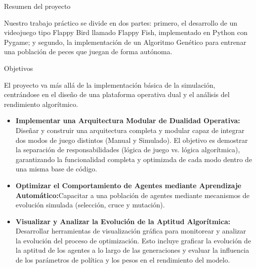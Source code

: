 \documentclass[final]{beamer}
\newlength{\colwidth}
\begin{document}
\begin{frame}[t]
\begin{columns}[t]
\begin{column}{\colwidth}
\begin{block}{Resumen del proyecto}
\begin{figure}
    \end{figure}

    Nuestro trabajo práctico se divide en dos partes: primero, el desarrollo
    de un videojuego tipo Flappy Bird llamado Flappy Fish, implementado en Python con Pygame;
    y segundo, la implementación de un Algoritmo Genético para entrenar una población
    de peces que juegan de forma autónoma.

  \end{block}


  \begin{alertblock}{Objetivos}

    El proyecto va más allá de la implementación básica de la simulación, centrándose en
    el diseño de una plataforma operativa dual y el análisis del rendimiento algorítmico.


    \begin{itemize}
      \item \textbf{Implementar una Arquitectura Modular de Dualidad Operativa:} Diseñar y
      construir una arquitectura completa y modular capaz de integrar dos modos de
      juego distintos (Manual y Simulado). El objetivo es demostrar la separación de
      responsabilidades (lógica de juego vs. lógica algorítmica), garantizando la
      funcionalidad completa y optimizada de cada modo dentro de una misma base de
      código.
      \vspace{17pt}
      \item \textbf{Optimizar el Comportamiento de Agentes mediante Aprendizaje Automático:}Capacitar a una población de agentes mediante mecanismos de
      evolución simulada (selección, cruce y mutación).
      \vspace{17pt}
      \item \textbf{Visualizar y Analizar la Evolución de la Aptitud Algorítmica:} Desarrollar
      herramientas de visualización gráfica para monitorear y analizar la evolución del
      proceso de optimización. Esto incluye graficar la evolución de la aptitud de los
      agentes a lo largo de las generaciones y evaluar la influencia de los parámetros de
      política y los pesos en el rendimiento del modelo.

    \end{itemize}

  \end{alertblock}



\end{column}
\end{columns}
\end{frame}
\end{document}
